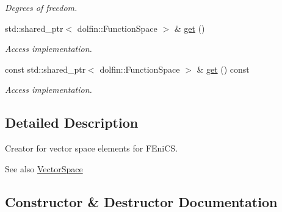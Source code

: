 \begin{DoxyCompactItemize}
\begin{DoxyCompactList}\small\item\em Degrees of freedom. \end{DoxyCompactList}\item 
std\+::shared\+\_\+ptr$<$ dolfin\+::\+Function\+Space $>$ \& \hyperlink{classSpacy_1_1Mixin_1_1Get_aaa3afedcb9b9e943f81d1686b70417db}{get} ()\hypertarget{classSpacy_1_1Mixin_1_1Get_aaa3afedcb9b9e943f81d1686b70417db}{}\label{classSpacy_1_1Mixin_1_1Get_aaa3afedcb9b9e943f81d1686b70417db}

\begin{DoxyCompactList}\small\item\em Access implementation. \end{DoxyCompactList}\item 
const std\+::shared\+\_\+ptr$<$ dolfin\+::\+Function\+Space $>$ \& \hyperlink{classSpacy_1_1Mixin_1_1Get_ab00e550fb3ac8208d0a25e17e705a9fc}{get} () const\hypertarget{classSpacy_1_1Mixin_1_1Get_ab00e550fb3ac8208d0a25e17e705a9fc}{}\label{classSpacy_1_1Mixin_1_1Get_ab00e550fb3ac8208d0a25e17e705a9fc}

\begin{DoxyCompactList}\small\item\em Access implementation. \end{DoxyCompactList}\end{DoxyCompactItemize}


\subsection{Detailed Description}
Creator for vector space elements for F\+Eni\+CS. 

\begin{DoxySeeAlso}{See also}
\hyperlink{classSpacy_1_1VectorSpace}{Vector\+Space} 
\end{DoxySeeAlso}


\subsection{Constructor \& Destructor Documentation}
